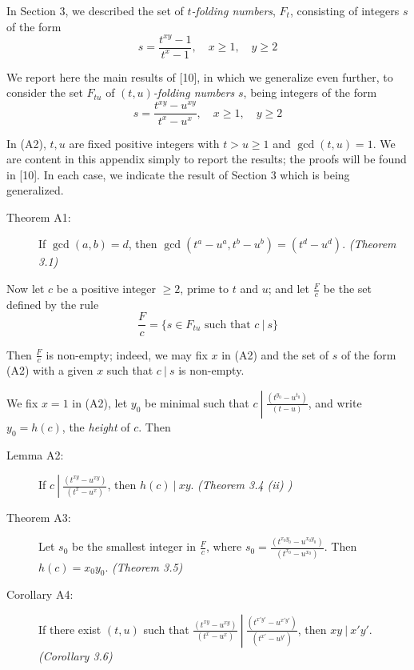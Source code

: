 In Section 3, we described the set of \emph{$t$-folding numbers}, $F_{t}$, consisting of integers $s$ of the form
\begin{equation}
s = \frac{t^{xy}-1}{t^{x}-1}, \quad x \geq 1, \quad y \geq 2  \tag{A1}
\end{equation}

We report here the main results of [10], in which we generalize even further, to consider the set $F_{tu}$ of \emph{$(t,u)$-folding numbers} $s$, being integers of the form
\begin{equation}
s = \frac{t^{xy}-u^{xy}}{t^{x}-u^{x}}, \quad x \geq 1, \quad y \geq 2  \tag{A2}
\end{equation}

In (A2), $t,u$ are fixed positive integers with $t > u \geq 1$ and $\gcd(t,u) = 1$. We are content in this appendix simply to report the results; the proofs will be found in [10]. In each case, we indicate the result of Section 3 which is being generalized.

\begin{description}

  \item[Theorem A1:] If $\gcd(a,b) = d$, then $\gcd (t^{a}-u^{a}, t^{b}-u^{b}) = (t^{d}-u^{d})$. \emph{(Theorem 3.1)}

\end{description}

Now let $c$ be a positive integer $\geq 2$, prime to $t$ and $u$; and let $\frac{F}{c}$ be the set defined by the rule
\begin{equation*}
\frac{F}{c} = \{ s \in F_{tu} \text{ such that } c\ |\ s \}
\end{equation*}

Then $\frac{F}{c}$ is non-empty; indeed, we may fix $x$ in (A2) and the set of $s$ of the form (A2) with a given $x$ such that $c\ |\ s$ is non-empty.

We fix $x=1$ in (A2), let $y_{0}$ be minimal such that $c\ \left|\ \frac{(t^{y_{0}}-u^{t_{0}})}{(t-u)} \right.$, and write $y_{0} = h(c)$, the \emph{height} of $c$. Then

\begin{description}

  \item[Lemma A2:] If $c\ \left|\ \frac{(t^{xy}-u^{xy})}{(t^{x}-u^{x})} \right.$, then $h(c)\ |\ xy$. \emph{(Theorem 3.4 (ii) )}

  \item[Theorem A3:] Let $s_{0}$ be the smallest integer in $\frac{F}{c}$, where $s_{0} = \frac{(t^{x_{0}y_{0}}-u^{x_{0}y_{0}})}{(t^{x_{0}}-u^{x_{0}})}$. Then $h(c) = x_{0} y_{0}$. \emph{(Theorem 3.5)}

  \item[Corollary A4:] If there exist $(t,u)$ such that $\frac{(t^{xy}-u^{xy})}{(t^{x}-u^{x})}\ \left|\ \frac{(t^{x'y'}-u^{x'y'})}{(t^{x'}-u^{y'})} \right.$, then $xy\ |\ x'y'$. \emph{(Corollary 3.6)}

\end{description}

